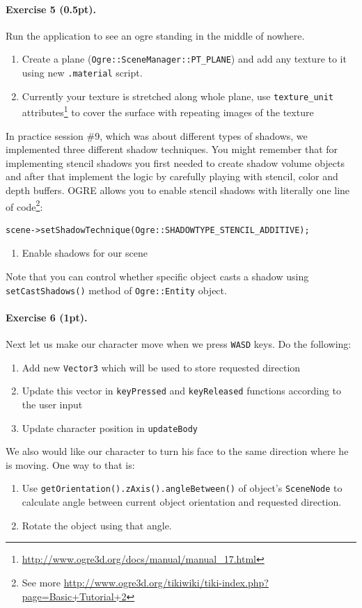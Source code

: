 \documentclass{article}
\newenvironment{exercise}[2]{\paragraph{Exercise #1 (#2pt).} }{
\medskip}
\begin{document}
\begin{exercise}{5}{0.5}
Run the application to see an ogre standing in the middle of nowhere.
\begin{enumerate}
	\item[1.]Create a plane (\verb#Ogre::SceneManager::PT_PLANE#) and add any texture to it using new \verb#.material# script.
	\item[2.]Currently your texture is stretched along whole plane, use \verb#texture_unit# attributes\footnote{\url{http://www.ogre3d.org/docs/manual/manual_17.html}} to cover the surface with repeating images of the texture
\end{enumerate}
In practice session \#9, which was about different types of shadows, we implemented three different shadow techniques. You might remember that for implementing stencil shadows you first needed to create shadow volume objects and after that implement the logic by carefully playing with stencil, color and depth buffers. OGRE allows you to enable stencil shadows with literally one line of code\footnote{See more \url{http://www.ogre3d.org/tikiwiki/tiki-index.php?page=Basic+Tutorial+2}}:
\begin{verbatim}
scene->setShadowTechnique(Ogre::SHADOWTYPE_STENCIL_ADDITIVE);
\end{verbatim}
\begin{enumerate}
	\item[3.] Enable shadows for our scene
\end{enumerate}
Note that you can control whether specific object casts a shadow using \verb#setCastShadows()# method of \verb#Ogre::Entity# object.
\end{exercise}

\begin{exercise}{6}{1}
Next let us make our character move when we press \verb#WASD# keys. Do the following:
\begin{enumerate}
\item Add new \verb#Vector3# which will be used to store requested direction
\item Update this vector in \verb#keyPressed# and \verb#keyReleased# functions according to the user input
\item Update character position in \verb#updateBody#
\end{enumerate}
We also would like our character to turn his face to the same direction where he is moving. One way to that is:
\begin{enumerate}
\item Use \verb#getOrientation().zAxis().angleBetween()# of object's \verb#SceneNode# to calculate angle between current object orientation and requested direction.
\item Rotate the object using that angle.
\end{enumerate}
\end{exercise}
\end{document}
